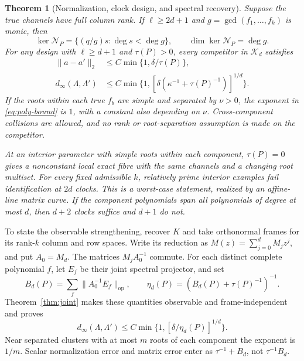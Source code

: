 \documentclass[11pt,reqno]{amsart}
\numberwithin{equation}{section}
\newtheorem{theorem}{Theorem}[section]
\theoremstyle{definition}\newtheorem{definition}[theorem]{Definition}
\theoremstyle{remark}\newtheorem{remark}[theorem]{Remark}
\newcommand{\op}{\mathrm{op}}
\newcommand{\cK}{\mathcal K}
\newcommand{\cN}{\mathcal N}
\begin{document}
\begin{theorem}[Normalization, clock design, and spectral recovery]
\label{thm:main}
Suppose the true channels have full column rank. If $\ell\ge2d+1$
and $g=\gcd(f_1,\ldots,f_k)$ is monic, then
\begin{equation}\label{eq:kernel}
 \ker\cN_P=\{(q/g)s:\deg s<\deg g\},\qquad
 \dim\ker\cN_P=\deg g.
\end{equation}
For any design with $\ell\ge d+1$ and $\tau(P)>0$, every competitor
in $\cK_d$ satisfies
\begin{align}
 \|a-a'\|_2&\le C\min\{1,\delta/\tau(P)\},        \label{eq:q-bound}\\
 d_\infty(\Lambda,\Lambda')&\le
 C\min\{1,[\delta(\kappa^{-1}+\tau(P)^{-1})]^{1/d}\}.
                                                        \label{eq:poly-bound}
\end{align}
If the roots within each true $f_b$ are simple and separated by
$\nu>0$, the exponent in \eqref{eq:poly-bound} is $1$, with a constant
also depending on $\nu$. Cross-component collisions are allowed, and
no rank or root-separation assumption is made on the competitor.

At an interior parameter with simple roots within each component,
$\tau(P)=0$ gives a nonconstant local exact fibre with the same channels
and a changing root multiset. For every fixed admissible $k$, relatively
prime interior examples fail identification at $2d$ clocks. This is a
worst-case statement, realized by an affine-line matrix curve. If the
component polynomials span all polynomials of degree at most $d$, then
$d+2$ clocks suffice and $d+1$ do not.
\end{theorem}

To state the observable strengthening, recover $K$ and take orthonormal
frames for its rank-$k$ column and row spaces. Write its reduction as
$M(z)=\sum_{j=0}^dM_jz^j$, and put $A_0=M_d$.
The matrices $M_jA_0^{-1}$ commute. For each distinct complete
polynomial $f$, let $E_f$ be their joint spectral projector, and set
\[
 B_d(P)=\sum_f\|A_0^{-1}E_f\|_\op,
 \qquad \eta_d(P)=(B_d(P)+\tau(P)^{-1})^{-1}.
\]
Theorem~\ref{thm:joint} makes these quantities observable and
frame-independent and proves
\[
 d_\infty(\Lambda,\Lambda')\le
 C\min\{1,[\delta/\eta_d(P)]^{1/d}\}.
\]
Near separated clusters with at most $m$ roots of each component the
exponent is $1/m$. Scalar normalization error and matrix error enter
as $\tau^{-1}+B_d$, not $\tau^{-1}B_d$.
\end{document}

